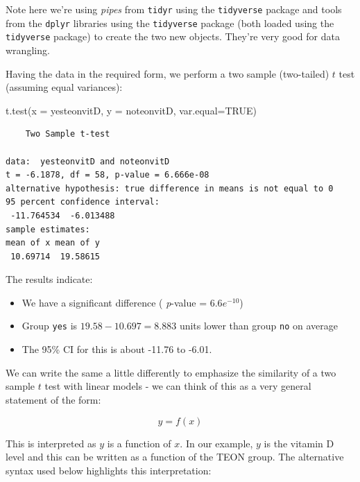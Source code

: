 \documentclass[
  oneside]{krantz}
\newenvironment{Shaded}{\begin{snugshade}}{\end{snugshade}}
\newcommand{\AttributeTok}[1]{\textcolor[rgb]{0.77,0.63,0.00}{#1}}
\newcommand{\CommentTok}[1]{\textcolor[rgb]{0.56,0.35,0.01}{\textit{#1}}}
\newcommand{\ConstantTok}[1]{\textcolor[rgb]{0.00,0.00,0.00}{#1}}
\newcommand{\FunctionTok}[1]{\textcolor[rgb]{0.00,0.00,0.00}{#1}}
\newcommand{\NormalTok}[1]{#1}
\newcommand{\OtherTok}[1]{\textcolor[rgb]{0.56,0.35,0.01}{#1}}
\newcommand{\SpecialCharTok}[1]{\textcolor[rgb]{0.00,0.00,0.00}{#1}}
\newcommand{\StringTok}[1]{\textcolor[rgb]{0.31,0.60,0.02}{#1}}
\providecommand{\tightlist}{%
  \setlength{\itemsep}{0pt}\setlength{\parskip}{0pt}}
\begin{document}
Note here we're using \emph{pipes} from \texttt{tidyr} using the \texttt{tidyverse} package \citep{R-tidyr} and tools from the \texttt{dplyr} libraries using the \texttt{tidyverse} package \citep{R-dplyr} (both loaded using the \texttt{tidyverse} package) to create the two new objects. They're very good for data wrangling.

Having the data in the required form, we perform a two sample (two-tailed) \(t\) test (assuming equal variances):

\begin{Shaded}
\begin{Highlighting}[]
\FunctionTok{t.test}\NormalTok{(}\AttributeTok{x =}\NormalTok{ yesteonvitD, }\AttributeTok{y =}\NormalTok{ noteonvitD, }\AttributeTok{var.equal=}\ConstantTok{TRUE}\NormalTok{)}
\end{Highlighting}
\end{Shaded}

\begin{verbatim}
    Two Sample t-test

data:  yesteonvitD and noteonvitD
t = -6.1878, df = 58, p-value = 6.666e-08
alternative hypothesis: true difference in means is not equal to 0
95 percent confidence interval:
 -11.764534  -6.013488
sample estimates:
mean of x mean of y 
 10.69714  19.58615 
\end{verbatim}

The results indicate:

\begin{itemize}
\tightlist
\item
  We have a significant difference ( \emph{p}-value = \(6.6e^{-10}\))
\item
  Group \texttt{yes} is \(19.58-10.697=8.883\) units lower than group \texttt{no} on average
\item
  The 95\% CI for this is about -11.76 to -6.01.
\end{itemize}

We can write the same a little differently to emphasize the similarity of a two sample \(t\) test with linear models - we can think of this as a very general statement of the form:

\[y=f(x)\]

This is interpreted as \(y\) is a function of \(x\). In our example, \(y\) is the vitamin D level and this can be written as a function of the TEON group. The alternative syntax used below highlights this interpretation:

\begin{Shaded}
\end{Shaded}
\end{document}
